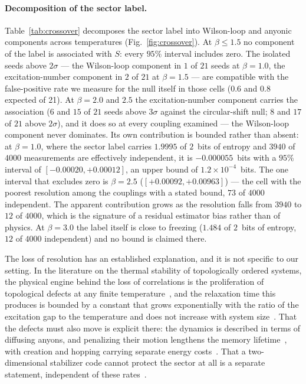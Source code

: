\documentclass[aps,pra,twocolumn,superscriptaddress,showpacs,floatfix]{revtex4-2}
\begin{document}
\paragraph{Decomposition of the sector label.}
Table~\ref{tab:crossover} decomposes the sector label into Wilson-loop and
anyonic components across temperatures (Fig.~\ref{fig:crossover}). At
$\beta \leq 1.5$ no component of the label is associated with $S$: every $95\%$
interval includes zero. The isolated seeds above $2\sigma$ --- the Wilson-loop
component in $1$ of $21$ seeds at $\beta = 1.0$, the excitation-number component
in $2$ of $21$ at $\beta = 1.5$ --- are compatible with the false-positive rate
we measure for the null itself in those cells ($0.6$ and $0.8$ expected of 21).
At $\beta = 2.0$ and $2.5$ the excitation-number component carries the
association ($6$ and $15$ of $21$ seeds above $3\sigma$ against the
circular-shift null; $8$ and $17$ of $21$ above $2\sigma$), and it does so at
every coupling examined --- the Wilson-loop component never dominates. Its own
contribution is bounded rather than absent: at $\beta = 1.0$, where the sector
label carries $1.9995$ of $2$~bits of entropy and $3940$ of $4000$ measurements
are effectively independent, it is $-0.000055$~bits with a $95\%$ interval of
$[-0.00020, +0.00012]$, an upper bound of $1.2\times10^{-4}$~bits. The one
interval that excludes zero is $\beta = 2.5$ ($[+0.00092, +0.00963]$) --- the
cell with the poorest resolution among the couplings with a stated bound, $73$
of $4000$ independent. The
apparent contribution grows as the resolution falls from $3940$ to $12$ of
$4000$, which is the signature of a residual estimator bias rather than of
physics. At $\beta = 3.0$ the label itself is close to freezing ($1.484$ of
$2$~bits of entropy, $12$ of $4000$ independent) and no bound is claimed
there.

The loss of resolution has an established explanation, and it is not specific
to our setting. In the literature on the thermal stability of topologically
ordered systems, the physical engine behind the loss of correlations is the
proliferation of topological defects at any finite
temperature~\cite{NussinovOrtiz2008}, and the relaxation time this produces is
bounded by a constant that grows exponentially with the ratio of the excitation
gap to the temperature and does not increase with system
size~\cite{AlickiFannesHorodecki2009}. That the defects must also move is
explicit there: the dynamics is described in terms of diffusing anyons, and
penalizing their motion lengthens the memory
lifetime~\cite{ChesiRoethlisbergerLoss2010}, with creation and hopping carrying
separate energy costs~\cite{PedrocchiHutterWoottonLoss2013}. That a
two-dimensional stabilizer code cannot protect the sector at all is a separate
statement, independent of these
rates~\cite{BravyiTerhal2009}.
\end{document}
